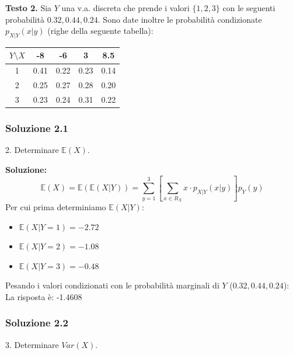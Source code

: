 \documentclass[12pt, a4paper]{article}
\begin{document}
\vspace{0.5cm}
\begin{tcolorbox}[colback=lightergray!10, colframe=tocsec]
\textbf{Testo 2.} Sia $Y$ una v.a. discreta che prende i valori $\{1,2,3\}$ con le seguenti probabilità $0.32, 0.44, 0.24$.
Sono date inoltre le probabilità condizionate $p_{X|Y}(x|y)$ (righe della seguente tabella):
\begin{center}
\begin{tabular}{c|cccc}
\toprule
$Y \setminus X$ & -8 & -6 & 3 & 8.5 \\
\midrule
1 & 0.41 & 0.22 & 0.23 & 0.14 \\
2 & 0.25 & 0.27 & 0.28 & 0.20 \\
3 & 0.23 & 0.24 & 0.31 & 0.22 \\
\bottomrule
\end{tabular}
\end{center}
\end{tcolorbox}

\subsubsection*{Soluzione 2.1}
2. Determinare $\mathbb{E}(X)$.

\textbf{Soluzione:}
$$ \mathbb{E}(X) = \mathbb{E}(\mathbb{E}(X|Y)) = \sum_{y=1}^3 \left[ \sum_{x \in R_X} x \cdot p_{X|Y}(x|y) \right] p_Y(y) $$
Per cui prima determiniamo $\mathbb{E}(X|Y)$:
\begin{itemize}
    \item $\mathbb{E}(X|Y=1) = -2.72$
    \item $\mathbb{E}(X|Y=2) = -1.08$
    \item $\mathbb{E}(X|Y=3) = -0.48$
\end{itemize}
Pesando i valori condizionati con le probabilità marginali di $Y$ ($0.32, 0.44, 0.24$):
La risposta è: -1.4608

\subsubsection*{Soluzione 2.2}
3. Determinare $Var(X)$.
\end{document}
